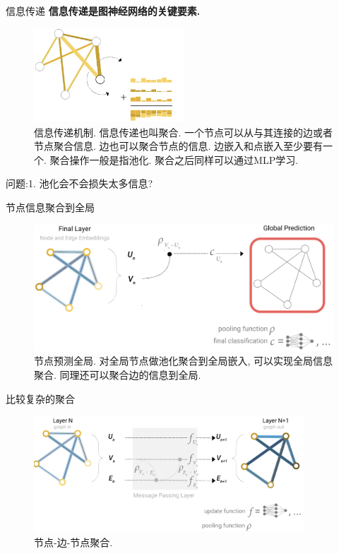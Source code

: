\documentclass{beamer}
\begin{document}
\begin{frame}{信息传递}
    \textbf{信息传递是图神经网络的关键要素.}
    \begin{figure}
        \centering
        \includegraphics[width=0.5\textwidth]{信息传递.png}
        \caption{信息传递机制. 信息传递也叫聚合. 一个节点可以从与其连接的边或者节点聚合信息. 边也可以聚合节点的信息. 边嵌入和点嵌入至少要有一个. 聚合操作一般是指池化. 聚合之后同样可以通过MLP学习.}
    \end{figure}
    问题:1. 池化会不会损失太多信息?
\end{frame}

\begin{frame}{节点信息聚合到全局}
    \begin{figure}
        \includegraphics[width=\textwidth]{节点预测全局.png}
        \caption{节点预测全局. 对全局节点做池化聚合到全局嵌入, 可以实现全局信息聚合. 同理还可以聚合边的信息到全局.}
    \end{figure}
\end{frame}

\begin{frame}{比较复杂的聚合}
    \begin{figure}
        \includegraphics[width=0.9\textwidth]{节点到边到节点聚合.png}
        \caption{节点-边-节点聚合.}
    \end{figure}
\end{frame}
\end{document}
